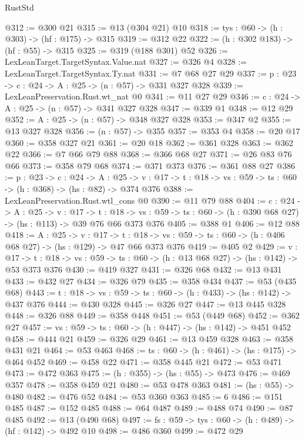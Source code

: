 \begin{lexlean}{RustStd}
\begin{coremodule}
{\begin{coremodule}
{{{{{{{{{{{{{{{{{{{{@312 := @300 @21
@315 := @13 (@304 @21) @10
@318 := {tys : @60} -> (h : @303) -> (hf : @175) -> @315
@319 := @312 @22
@322 := (h : @302 @183) -> (hf : @55) -> @315
@325 := @319 (@188 @301) @52
@326 := LexLeanTarget.TargetSyntax.Value.nat
@327 := @326 @4
@328 := LexLeanTarget.TargetSyntax.Ty.nat
@331 := @7 @68 @27 @29
@337 := {p : @23} -> {c : @24} -> {A : @25} -> (n : @57) -> @331 @327 @328
@339 := LexLeanPreservation.Rust.wt_nat @0
@341 := @11 @27 @29
@346 := {c : @24} -> {A : @25} -> (n : @57) -> @341 @327 @328
@347 := @339 @1
@348 := @12 @29
@352 := {A : @25} -> (n : @57) -> @348 @327 @328
@353 := @347 @2
@355 := @13 @327 @328
@356 := (n : @57) -> @355
@357 := @353 @4
@358 := @20 @17
@360 := @358 @327 @21
@361 := @20 @18
@362 := @361 @328
@363 := @362 @22
@366 := @7 @66 @79 @88
@368 := @366 @68 @27
@371 := @26 @83 @76 @66
@373 := @358 @79 @68
@374 := @371 @373
@376 := @361 @88 @27
@386 := {p : @23} ->
  {c : @24} ->
  {A : @25} ->
  {v : @17} -> {t : @18} -> {vs : @59} -> {ts : @60} -> (h : @368) -> (hs : @82) -> @374 @376
@388 := LexLeanPreservation.Rust.wtl_cons @0
@390 := @11 @79 @88
@404 := {c : @24} ->
  {A : @25} ->
  {v : @17} ->
  {t : @18} ->
  {vs : @59} -> {ts : @60} -> (h : @390 @68 @27) -> (hs : @113) -> @39 @76 @66 @373 @376
@405 := @388 @1
@406 := @12 @88
@418 := {A : @25} ->
  {v : @17} ->
  {t : @18} -> {vs : @59} -> {ts : @60} -> (h : @406 @68 @27) -> (hs : @129) -> @47 @66 @373 @376
@419 := @405 @2
@429 := {v : @17} ->
  {t : @18} -> {vs : @59} -> {ts : @60} -> (h : @13 @68 @27) -> (hs : @142) -> @53 @373 @376
@430 := @419 @327
@431 := @326 @68
@432 := @13 @431
@433 := @432 @27
@434 := @326 @79
@435 := @358 @434
@437 := @53 (@435 @68)
@443 := {t : @18} -> {vs : @59} -> {ts : @60} -> (h : @433) -> (hs : @142) -> @437 @376
@444 := @430 @328
@445 := @326 @27
@447 := @13 @445 @328
@448 := @326 @88
@449 := @358 @448
@451 := @53 (@449 @68)
@452 := @362 @27
@457 := {vs : @59} -> {ts : @60} -> (h : @447) -> (hs : @142) -> @451 @452
@458 := @444 @21
@459 := @326 @29
@461 := @13 @459 @328
@463 := @358 @431 @21
@464 := @53 @463
@468 := {ts : @60} -> (h : @461) -> (hs : @175) -> @464 @452
@469 := @458 @22
@471 := @358 @445 @21
@472 := @53 @471
@473 := @472 @363
@475 := (h : @355) -> (hs : @55) -> @473
@476 := @469 @357
@478 := @358 @459 @21
@480 := @53 @478 @363
@481 := (hs : @55) -> @480
@482 := @476 @52
@484 := @53 @360 @363
@485 := 6
@486 := @151 @485
@487 := @152 @485
@488 := @64 @487
@489 := @488 @74
@490 := @87 @485
@492 := @13 (@490 @68)
@497 := {fs : @59} -> {tys : @60} -> (h : @489) -> (hf : @142) -> @492 @10
@498 := @486 @360
@499 := @472 @29
}}}}}}}}}}}}}}}}}}}}
\end{coremodule}}
\end{coremodule}
\end{lexlean}

